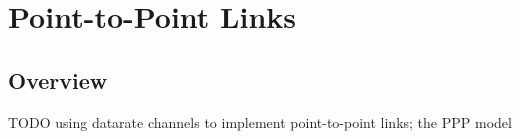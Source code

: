 \chapter{Point-to-Point Links}
\label{cha:ppp}


\section{Overview}

TODO using datarate channels to implement point-to-point links; the PPP model




